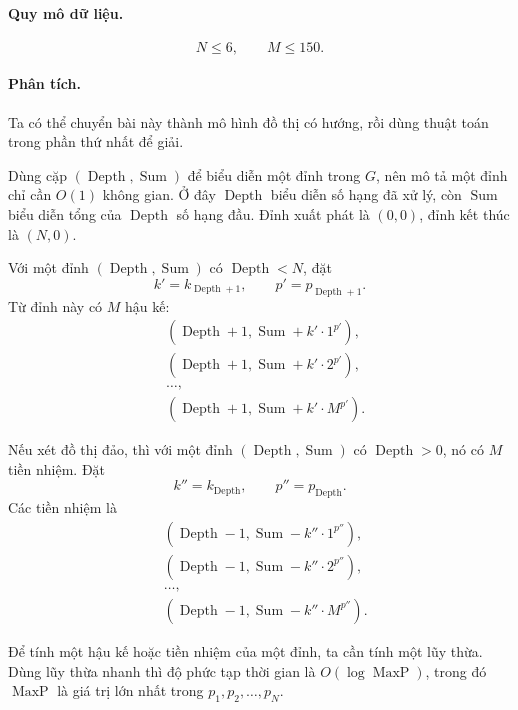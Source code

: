 \documentclass[11pt]{article}
\begin{document}
\paragraph{Quy mô dữ liệu.}
\[
  N\le 6,\qquad M\le 150.
\]

\paragraph{Phân tích.}
Ta có thể chuyển bài này thành mô hình đồ thị có hướng, rồi dùng thuật toán
trong phần thứ nhất để giải.

Dùng cặp \((\operatorname{Depth},\operatorname{Sum})\) để biểu diễn một đỉnh
trong \(G\), nên mô tả một đỉnh chỉ cần \(O(1)\) không gian. Ở đây
\(\operatorname{Depth}\) biểu diễn số hạng đã xử lý, còn
\(\operatorname{Sum}\) biểu diễn tổng của \(\operatorname{Depth}\) số hạng
đầu. Đỉnh xuất phát là \((0,0)\), đỉnh kết thúc là \((N,0)\).

Với một đỉnh \((\operatorname{Depth},\operatorname{Sum})\) có
\(\operatorname{Depth}<N\), đặt
\[
  k'=k_{\operatorname{Depth}+1},\qquad
  p'=p_{\operatorname{Depth}+1}.
\]
Từ đỉnh này có \(M\) hậu kế:
\[
\begin{aligned}
  &(\operatorname{Depth}+1,\operatorname{Sum}+k'\cdot 1^{p'}),\\
  &(\operatorname{Depth}+1,\operatorname{Sum}+k'\cdot 2^{p'}),\\
  &\ldots,\\
  &(\operatorname{Depth}+1,\operatorname{Sum}+k'\cdot M^{p'}).
\end{aligned}
\]

Nếu xét đồ thị đảo, thì với một đỉnh \((\operatorname{Depth},\operatorname{Sum})\)
có \(\operatorname{Depth}>0\), nó có \(M\) tiền nhiệm. Đặt
\[
  k''=k_{\operatorname{Depth}},\qquad p''=p_{\operatorname{Depth}}.
\]
Các tiền nhiệm là
\[
\begin{aligned}
  &(\operatorname{Depth}-1,\operatorname{Sum}-k''\cdot 1^{p''}),\\
  &(\operatorname{Depth}-1,\operatorname{Sum}-k''\cdot 2^{p''}),\\
  &\ldots,\\
  &(\operatorname{Depth}-1,\operatorname{Sum}-k''\cdot M^{p''}).
\end{aligned}
\]

Để tính một hậu kế hoặc tiền nhiệm của một đỉnh, ta cần tính một lũy thừa.
Dùng lũy thừa nhanh thì độ phức tạp thời gian là \(O(\log \operatorname{MaxP})\),
trong đó \(\operatorname{MaxP}\) là giá trị lớn nhất trong
\(p_1,p_2,\ldots,p_N\).
\end{document}
